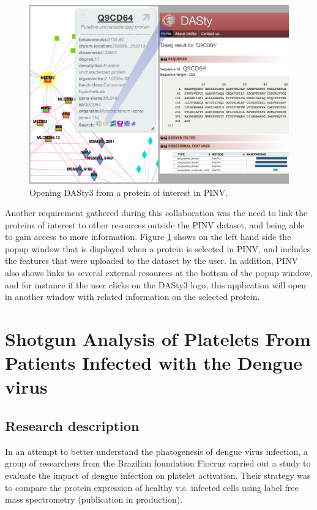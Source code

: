 \begin{figure}
\centering
\includegraphics[width=5in]{figures/pinv2dasty.png}
\caption[Opening DASty3 from a protein of interest in PINV.]{Opening DASty3 from a protein of interest in PINV.
\label{fig:pinv2dasty}}
\end{figure}

Another requirement gathered during this collaboration was the need to link the proteins of interest to other resources outside the PINV dataset, and being able to gain access to more information. Figure \ref{fig:pinv2dasty} shows on the left hand side the popup window that is displayed when a protein is selected in PINV, and includes the features that were uploaded to the dataset by the user. In addition, PINV also shows links to several external resources at the bottom of the popup window, and for instance if the user clicks on the DASty3 logo, this application will open in another window with related information on the selected protein.


\section{Shotgun Analysis of Platelets From Patients Infected with the Dengue virus}
\label{sec:dengue}
\subsection{Research description}
In an attempt to better understand the phatogenesis of dengue virus infection, a group of researchers from the Brazilian foundation Fiocruz carried out a study to evaluate the impact of dengue infection on platelet activation. Their strategy was to compare the protein expression of healthy v.s. infected cells using label free mass spectrometry (publication in production).

